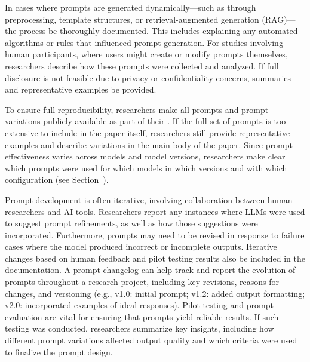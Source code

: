 In cases where prompts are generated dynamically—such as through preprocessing, template structures, or retrieval-augmented generation (RAG)—the process \must be thoroughly documented.
This includes explaining any automated algorithms or rules that influenced prompt generation.
For studies involving human participants, where users might create or modify prompts themselves, researchers \must describe how these prompts were collected and analyzed.
If full disclosure is not feasible due to privacy or confidentiality concerns, summaries and representative examples \should be provided.

To ensure full reproducibility, researchers \must make all prompts and prompt variations publicly available as part of their \supplementarymaterial.
If the full set of prompts is too extensive to include in the paper itself, researchers \should still provide representative examples and describe variations in the main body of the paper.
Since prompt effectiveness varies across models and model versions, researchers \must make clear which prompts were used for which models in which versions and with which configuration (see Section~\modelversion).

Prompt development is often iterative, involving collaboration between human researchers and AI tools.
Researchers \should report any instances where LLMs were used to suggest prompt refinements, as well as how those suggestions were incorporated.
Furthermore, prompts may need to be revised in response to failure cases where the model produced incorrect or incomplete outputs.
Iterative changes based on human feedback and pilot testing results \should also be included in the documentation.
A prompt changelog can help track and report the evolution of prompts throughout a research project, including key revisions, reasons for changes, and versioning (e.g., v1.0: initial prompt; v1.2: added output formatting; v2.0: incorporated examples of ideal responses).
Pilot testing and prompt evaluation are vital for ensuring that prompts yield reliable results. If such testing was conducted, researchers \should summarize key insights, including how different prompt variations affected output quality and which criteria were used to finalize the prompt design.

